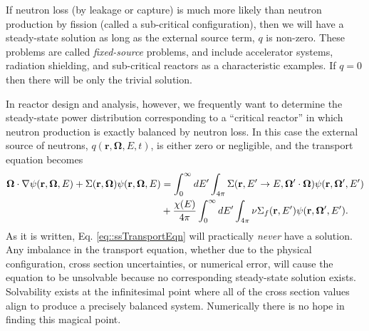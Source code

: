 \documentclass[11pt]{article}
\renewcommand\vec{\mathbf}
\begin{document}
If neutron loss (by leakage or capture) is much more likely than neutron production by fission (called a sub-critical configuration), then we will have a steady-state solution as long as the external source term, \(q\) is non-zero.  These problems are called \emph{fixed-source} problems, and include accelerator systems, radiation shielding, and sub-critical reactors as a characteristic examples.  If \(q=0\) then there will be only the trivial solution.

In reactor design and analysis, however, we frequently want to determine the steady-state power distribution corresponding to a ``critical reactor'' in which neutron production is exactly balanced by neutron loss.  In this case the external source of neutrons, \(q(\vec{r},\vec{\Omega},E,t)\), is either zero or negligible, and the transport equation becomes
\begin{align}
  \vec{\Omega} \cdot \nabla\psi(\vec{r},\vec{\Omega},E)
  + \Sigma(\vec{r},\vec{\Omega}) \psi(\vec{r},\vec{\Omega},E)
  &= \int_0^\infty dE' \int_{4\pi} \Sigma(\vec{r},E' \rightarrow E, \vec{\Omega}'\cdot\vec{\Omega}) \psi(\vec{r},\vec{\Omega}',E') \notag\\
  &+ \frac{\chi(E)}{4\pi} \int_0^\infty dE' \int_{4\pi} \nu\Sigma_f(\vec{r},E') \psi(\vec{r},\vec{\Omega}',E').
  \label{eq::ssTransportEqn}
\end{align}
As it is written, Eq. \eqref{eq::ssTransportEqn} will practically \emph{never} have a solution.  Any imbalance in the transport equation, whether due to the physical configuration, cross section uncertainties, or numerical error, will cause the equation to be unsolvable because no corresponding steady-state solution exists.  Solvability exists at the infinitesimal point where all of the cross section values align to produce a precisely balanced system.  Numerically there is no hope in finding this magical point.
\end{document}
